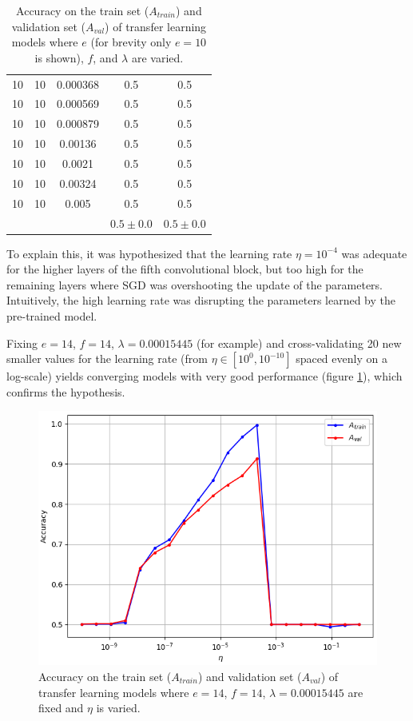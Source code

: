 \begin{table}[ht]
\begin{tabular}{ |c|c|c|c|c| }
10 & 10 & 0.000368 & 0.5 & 0.5 \\
10 & 10 & 0.000569 & 0.5 & 0.5 \\
10 & 10 & 0.000879 & 0.5 & 0.5 \\
10 & 10 & 0.00136 & 0.5 & 0.5 \\
10 & 10 & 0.0021 & 0.5 & 0.5 \\
10 & 10 & 0.00324 & 0.5 & 0.5 \\
10 & 10 & 0.005 & 0.5 & 0.5 \\
\hline
 & & & $0.5\pm0.0$ & $0.5\pm0.0$ \\
\hline
\end{tabular}
    \caption{Accuracy on the train set ($A_{train}$) and validation set ($A_{val}$) of transfer learning models where $e$ (for brevity only $e = 10$ is shown), $f$, and $\lambda$ are varied.}
\label{table:vgg16_partial}
\end{table}

To explain this, it was hypothesized that the learning rate $\eta = 10^{-4}$ was adequate for the higher layers of the fifth convolutional block, but too high for the remaining layers where \ac{SGD} was overshooting the update of the parameters. Intuitively, the high learning rate was disrupting the parameters learned by the pre-trained model.

Fixing $e = 14$, $f = 14$, $\lambda = 0.00015445$ (for example) and cross-validating 20 new smaller values for the learning rate (from $\eta \in [10^0, 10^{-10}]$ spaced evenly on a log-scale) yields converging models with very good performance (figure \ref{fig:vgg16_partial_lr}), which confirms the hypothesis.

\begin{figure}[ht]
    \centering
    \includegraphics[width=1.0\textwidth]{figs/vgg16_partial_lr.png}
    \caption{Accuracy on the train set ($A_{train}$) and validation set ($A_{val}$) of transfer learning models where $e = 14$, $f = 14$, $\lambda = 0.00015445$ are fixed and $\eta$ is varied.}
    \label{fig:vgg16_partial_lr}
\end{figure}

